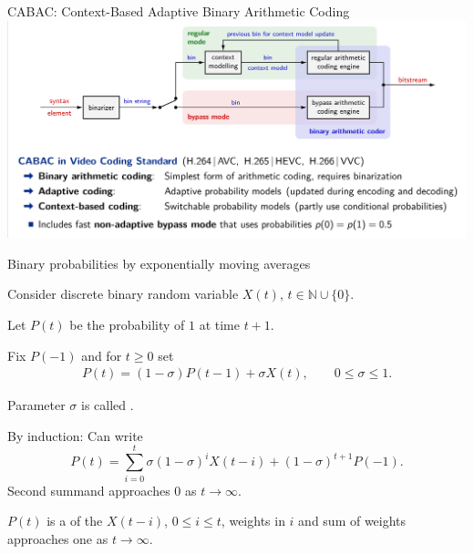 \begin{frame}{CABAC: Context-Based Adaptive Binary Arithmetic Coding}
 \includegraphics[width=\textwidth]{LosslessIII/CabacBasicDesign.png}
\end{frame}




\begin{frame}{Binary probabilities by exponentially moving averages}
\bit
\item Consider discrete binary random variable $X(t)$, $t\in\mathbb{N}\cup\{0\}$. 
\item Let $P(t)$ be the probability of $1$ at time $t+1$. 
\eit
{}
\bit
\item Fix $P(-1)$ and for $t\geq 0$ set
\begin{align}\label{SlideWindowProb}
P(t)=(1-\sigma) P(t-1)+\sigma X(t), \qquad 0\leq \sigma\leq 1. 
\end{align}
\item Parameter $\sigma$ is called .
\eit
\bit
\item By induction: Can write
\[
P(t)=\sum_{i=0}^{t}\sigma(1-\sigma)^iX(t-i)+(1-\sigma)^{t+1}P(-1). 
\] 
Second summand approaches $0$ as $t\to\infty$.
\item[\iarrow] $P(t)$ is a  of the $X(t-i)$, $0\leq i\leq t$, weights  in $i$ and sum of weights approaches one as $t\to\infty$.
\eit
\end{frame}

